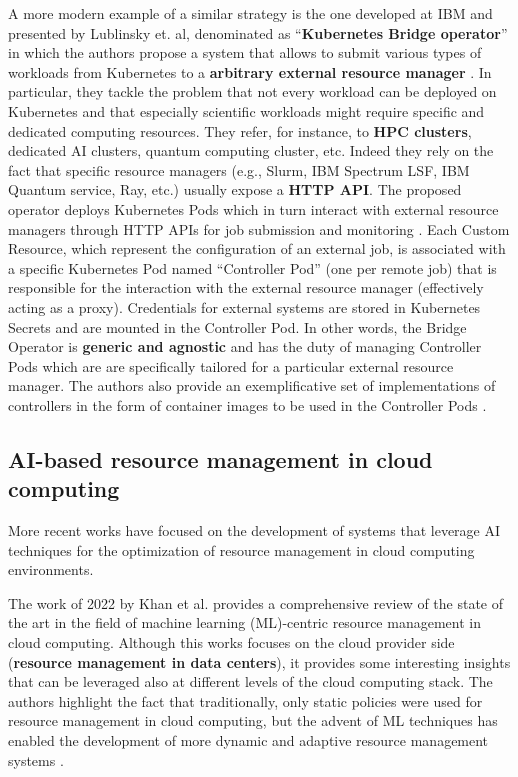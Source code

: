 A more modern example of a similar strategy is the one developed at IBM and presented by Lublinsky et. al, denominated as ``\textbf{Kubernetes Bridge operator}'' in which the authors propose a system that allows to submit various types of workloads from Kubernetes to a \textbf{arbitrary external resource manager} \cite{lublinsky2022kubernetesbridgeoperatorcloud}.
In particular, they tackle the problem that not every workload can be deployed on Kubernetes and that especially scientific workloads might require specific and dedicated computing resources.
They refer, for instance, to \textbf{HPC clusters}, dedicated AI clusters, quantum computing cluster, etc.
Indeed they rely on the fact that specific resource managers (e.g., Slurm, IBM Spectrum LSF, IBM Quantum service, Ray, etc.) usually expose a \textbf{HTTP API}.
The proposed operator deploys Kubernetes Pods which in turn interact with external resource managers through HTTP APIs for job submission and monitoring \cite{lublinsky2022kubernetesbridgeoperatorcloud}.
Each Custom Resource, which represent the configuration of an external job, is associated with a specific Kubernetes Pod named ``Controller Pod'' (one per remote job) that is responsible for the interaction with the external resource manager (effectively acting as a proxy).
Credentials for external systems are stored in Kubernetes Secrets and are mounted in the Controller Pod.
In other words, the Bridge Operator is \textbf{generic and agnostic} and has the duty of managing Controller Pods which are are specifically tailored for a particular external resource manager.
The authors also provide an exemplificative set of implementations of controllers in the form of container images to be used in the Controller Pods \cite{lublinsky2022kubernetesbridgeoperatorcloud}.

\subsection{AI-based resource management in cloud computing}
\label{sec:ai_based_resource_management}

More recent works have focused on the development of systems that leverage AI techniques for the optimization of resource management in cloud computing environments.

The work of 2022 by Khan et al. \cite{KHAN2022103405} provides a comprehensive review of the state of the art in the field of machine learning (ML)-centric resource management in cloud computing.
Although this works focuses on the cloud provider side (\textbf{resource management in data centers}), it provides some interesting insights that can be leveraged also at different levels of the cloud computing stack.
The authors highlight the fact that traditionally, only static policies were used for resource management in cloud computing, but the advent of ML techniques has enabled the development of more dynamic and adaptive resource management systems \cite{KHAN2022103405}. \newline

